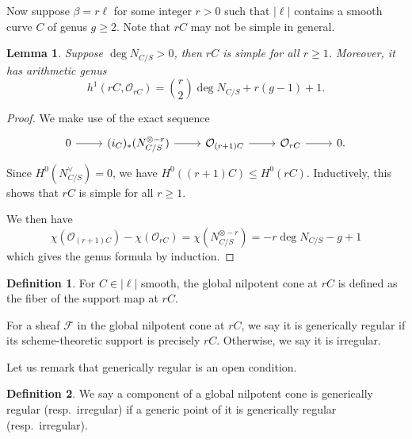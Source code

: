 \documentclass{amsart}
\theoremstyle{plain}
\newtheorem{lemma}[theorem]{Lemma}
\theoremstyle{definition}
\newtheorem{definition}{Definition}[section]
\theoremstyle{remark}
\begin{document}
Now suppose $\beta=r\ell$ for some integer $r>0$ such that $|\ell|$ contains a smooth curve $C$ of genus $g\ge 2$.
Note that $rC$ may not be simple in general.
\begin{lemma}\label{lem:rCgenus}
    Suppose $\deg N_{C/S}>0$, then $rC$ is simple for all $r\ge 1$.
    Moreover, it has arithmetic genus
    \[h^1(rC,\mathcal O_{rC})=\binom{r}{2}\deg N_{C/S}+r(g-1)+1.\]
\end{lemma}
\begin{proof}
    We make use of the exact sequence
    \[\begin{tikzcd}
        0\rar& (i_C)_\ast(N_{C/S}^{\otimes -r})\rar& \mathcal O_{(r+1)C}\rar&\mathcal O_{rC}\rar&0.
    \end{tikzcd}\]
    Since $H^0(N_{C/S}^\vee)=0$, we have $H^0((r+1)C)\le H^0(rC)$.
    Inductively, this shows that $rC$ is simple for all $r\ge 1$.

    We then have
    \[\chi(\mathcal O_{(r+1)C})-\chi(\mathcal O_{rC})=\chi(N_{C/S}^{\otimes-r})=-r\deg N_{C/S}-g+1\]
    which gives the genus formula by induction.
\end{proof}
\begin{definition}
    For $C\in|\ell|$ smooth, the global nilpotent cone at $rC$ is defined as the fiber of the support map at $rC$.

    For a sheaf $\mathcal F$ in the global nilpotent cone at $rC$, we say it is generically regular if its scheme-theoretic support is precisely $rC$.
    Otherwise, we say it is irregular.
\end{definition}
Let us remark that generically regular is an open condition.
\begin{definition}
    We say a component of a global nilpotent cone is generically regular (resp.~irregular) if a generic point of it is generically regular (resp.~irregular).
\end{definition}
\end{document}
